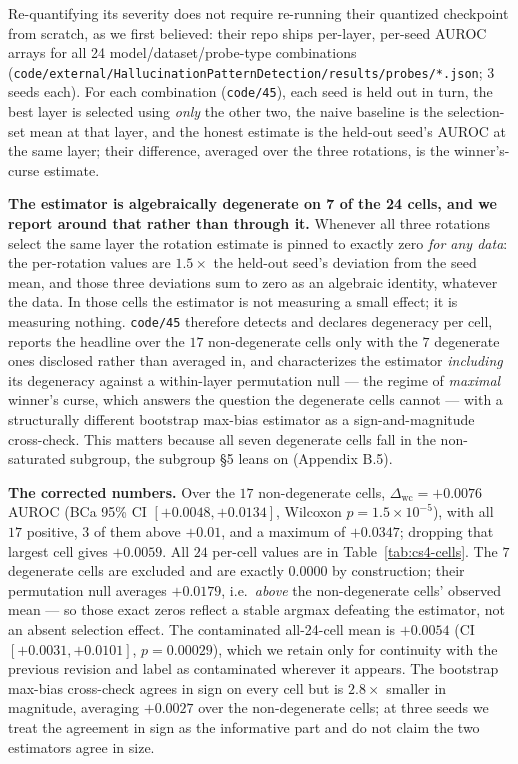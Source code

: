 \documentclass[10pt]{article} %
\begin{document}
Re-quantifying its severity does not require re-running their quantized
checkpoint from scratch, as we first believed: their repo ships per-layer,
per-seed AUROC arrays for all 24 model/dataset/probe-type combinations
(\texttt{code/external/HallucinationPatternDetection/results/probes/*.json};
3 seeds each). For each combination (\texttt{code/45}), each seed is held out in turn,
the best layer is selected using \emph{only} the other two, the naive baseline
is the selection-set mean at that layer, and the honest estimate is the
held-out seed's AUROC at the same layer; their difference, averaged over the
three rotations, is the winner's-curse estimate.

\textbf{The estimator is algebraically degenerate on 7 of the 24 cells, and we
report around that rather than through it.} Whenever all three rotations select
the same layer the rotation estimate is pinned to exactly zero \emph{for any
data}: the per-rotation values are $1.5\times$ the held-out seed's deviation
from the seed mean, and those three deviations sum to zero as an algebraic
identity, whatever the data. In those
cells the estimator is not measuring a small effect; it is measuring nothing.
\texttt{code/45} therefore detects and declares degeneracy per cell, reports
the headline over the $17$ non-degenerate cells only with the $7$ degenerate
ones disclosed rather than averaged in, and characterizes the estimator
\emph{including} its degeneracy against a within-layer permutation null --- the
regime of \emph{maximal} winner's curse, which answers the question the
degenerate cells cannot --- with a structurally different bootstrap max-bias
estimator as a sign-and-magnitude cross-check. This matters because all seven
degenerate cells fall in the non-saturated subgroup, the subgroup §5 leans on
(Appendix B.5).

\textbf{The corrected numbers.} Over the $17$ non-degenerate cells,
$\Delta_{\text{wc}}=+0.0076$ AUROC (BCa 95\% CI $[+0.0048,+0.0134]$, Wilcoxon
$p=1.5\times10^{-5}$), with all $17$ positive, $3$ of them above $+0.01$, and a
maximum of $+0.0347$; dropping that largest cell gives $+0.0059$. All $24$
per-cell values are in Table~\ref{tab:cs4-cells}. The $7$ degenerate cells are
excluded and are exactly $0.0000$ by construction; their permutation null
averages $+0.0179$, i.e.\ \emph{above} the non-degenerate cells' observed mean
--- so those exact zeros reflect a stable argmax defeating the estimator, not an
absent selection effect. The contaminated all-24-cell mean is $+0.0054$ (CI
$[+0.0031,+0.0101]$, $p=0.00029$), which we retain only for continuity with
the previous revision and label as contaminated wherever it appears. The
bootstrap max-bias cross-check agrees in sign on every cell but is $2.8\times$
smaller in magnitude, averaging $+0.0027$ over the non-degenerate cells; at
three seeds we treat the agreement in sign as the informative part and do not
claim the two estimators agree in size.
\end{document}
